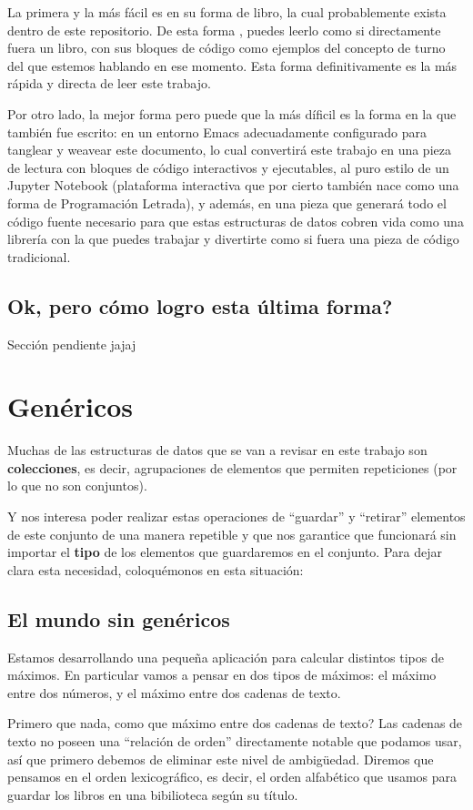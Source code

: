 \documentclass[11pt]{article}
\begin{document}
La primera y la más fácil es en su forma de libro, la cual probablemente exista dentro de este repositorio. De esta forma , puedes leerlo como si directamente fuera un libro, con sus bloques de código como ejemplos del concepto de turno del que estemos hablando en ese momento. Esta forma definitivamente es la más rápida y directa de leer este trabajo.

Por otro lado, la mejor forma pero puede que la más díficil es la forma en la que también fue escrito: en un entorno Emacs adecuadamente configurado para tanglear y weavear este documento, lo cual convertirá este trabajo en una pieza de lectura con bloques de código interactivos y ejecutables, al puro estilo de un Jupyter Notebook (plataforma interactiva que por cierto también nace como una forma de Programación Letrada), y además, en una pieza que generará todo el código fuente necesario para que estas estructuras de datos cobren vida como una librería con la que puedes trabajar y divertirte como si fuera una pieza de código tradicional.
\subsection{Ok, pero cómo logro esta última forma?}
\label{sec:org1ff1abb}
Sección pendiente jajaj
\section{Genéricos}
\label{sec:org110b7cb}
Muchas de las estructuras de datos que se van a revisar en este trabajo son \textbf{\textbf{colecciones}}, es decir, agrupaciones de elementos que permiten repeticiones (por lo que no son conjuntos).

Y nos interesa poder realizar estas operaciones de ``guardar'' y ``retirar'' elementos de este conjunto de una manera repetible y que nos garantice que funcionará sin importar el \textbf{\textbf{tipo}} de los elementos que guardaremos en el conjunto. Para dejar clara esta necesidad, coloquémonos en esta situación:
\subsection{El mundo sin genéricos}
\label{sec:org89825e2}

Estamos desarrollando una pequeña aplicación para calcular distintos tipos de máximos. En particular vamos a pensar en dos tipos de máximos: el máximo entre dos números, y el máximo entre dos cadenas de texto.

Primero que nada, como que máximo entre dos cadenas de texto? Las cadenas de texto no poseen una ``relación de orden'' directamente notable que podamos usar, así que primero debemos de eliminar este nivel de ambigüedad. Diremos que pensamos en el orden lexicográfico, es decir, el orden alfabético que usamos para guardar los libros en una bibilioteca según su título.
\end{document}

